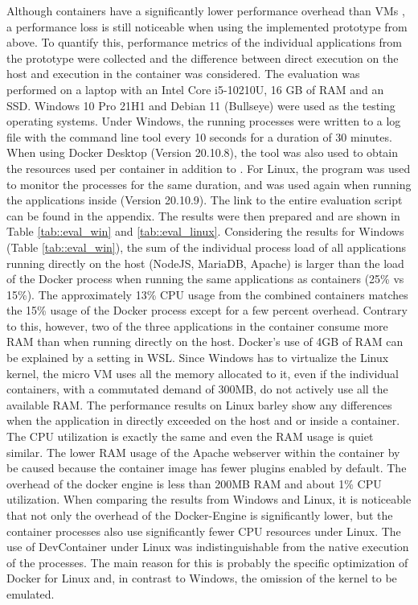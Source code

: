         Although containers have a significantly lower performance overhead than \ac{VM}s \cite{ieee_perfomance}, a performance loss is still noticeable when using the implemented prototype from above. To quantify this, performance metrics of the individual applications from the prototype were collected and the difference between direct execution on the host and execution in the container was considered.\newline
        The evaluation was performed on a laptop with an Intel Core i5-10210U, 16 GB of RAM and an SSD. Windows 10 Pro 21H1 and Debian 11 (Bullseye) were used as the testing operating systems. Under Windows, the running processes were written to a log file with the command line tool  every 10 seconds for a duration of 30 minutes. When using Docker Desktop (Version 20.10.8), the tool  was also used to obtain the resources used per container in addition to . For Linux, the  program was used to monitor the processes for the same duration, and  was used again when running the applications inside  (Version 20.10.9). The link to the entire evaluation script can be found in the appendix. The results were then prepared and are shown in Table \ref{tab::eval_win} and \ref{tab::eval_linux}.\newline
        Considering the results for Windows (Table \ref{tab::eval_win}), the sum of the individual process load of all applications running directly on the host (NodeJS, MariaDB, Apache) is larger than the load of the Docker process when running the same applications as containers (25\% vs 15\%). The approximately 13\% CPU usage from the combined containers matches the 15\% usage of the Docker process except for a few percent overhead. Contrary to this, however, two of the three applications in the container consume more RAM than when running directly on the host. Docker's use of 4GB of RAM can be explained by a setting in \ac{WSL}. Since Windows has to virtualize the Linux kernel, the micro \ac{VM} uses all the memory allocated to it, even if the individual containers, with a commutated demand of 300MB, do not actively use all the available RAM.\newline
        The performance results on Linux barley show any differences when the application in directly exceeded on the host and or inside a container. The CPU utilization is exactly the same and even the RAM usage is quiet similar. The lower RAM usage of the Apache webserver within the container by be caused because the container image has fewer plugins enabled by default. The overhead of the docker engine is less than 200MB RAM and about 1\% CPU utilization. When comparing the results from Windows and Linux, it is noticeable that not only the overhead of the Docker-Engine is significantly lower, but the container processes also use significantly fewer CPU resources under Linux. The use of DevContainer under Linux was indistinguishable from the native execution of the processes. The main reason for this is probably the specific optimization of Docker for Linux and, in contrast to Windows, the omission of the kernel to be emulated.\newline
